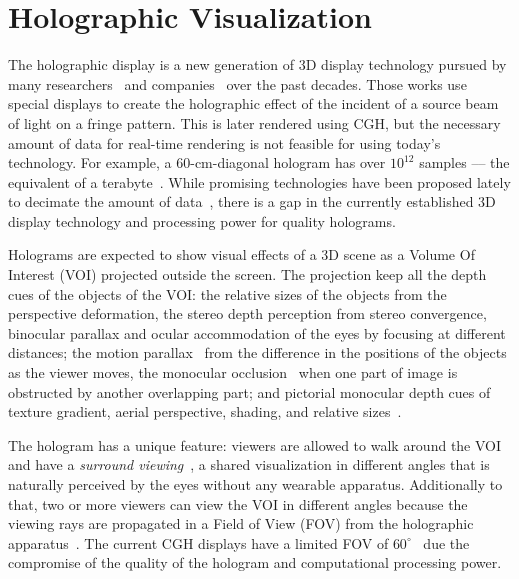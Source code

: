 \section{Holographic Visualization}
\label{sec.holographic_visualization}

The holographic display is a new generation of 3D display technology pursued by many researchers~\cite{Lucente1992, Watlington1995, Lucente2012} and companies~\cite{schwerdtner2013} over the past decades. Those works use special displays to create the holographic effect of the incident of a source beam of light on a fringe pattern. This is later rendered using CGH, but the necessary amount of data for real-time rendering is not feasible for using today's technology. For example, a 60-cm-diagonal hologram has over $10^{12}$ samples --– the equivalent of a terabyte~\cite{Lucente2012}. While promising technologies have been proposed lately to decimate the amount of data~\cite{Lucente1992, schwerdtner2013}, there is a gap in the currently established 3D display technology and processing power for quality holograms. 

Holograms are expected to show visual effects of a 3D scene as a Volume Of Interest (VOI) projected outside the screen. The projection keep all the depth cues of the objects of the VOI: the relative sizes of the objects from the perspective deformation, the stereo depth perception from stereo convergence, binocular parallax and ocular accommodation of the eyes by focusing at different distances; the motion parallax~\cite{li2012} from the difference in the positions of the objects as the viewer moves, the monocular occlusion~\cite{Lucente1995} when one part of image is obstructed by another overlapping part; and pictorial monocular depth cues of texture gradient, aerial perspective, shading, and relative sizes~\cite{Lucente1995}. 

The hologram has a unique feature: viewers are allowed to walk around the VOI and have a \emph{surround viewing}~\cite{debevec2006}, a shared visualization in different angles that is naturally perceived by the eyes without any wearable apparatus. Additionally to that, two or more viewers can view the VOI in different angles because the viewing rays are propagated in a Field of View (FOV) from the holographic apparatus~\cite{Lucente1992}. The current CGH displays have a limited FOV of $60^{\circ}$~\cite{Slinger2005, Lucente1995} due the compromise of the quality of the hologram and computational processing power.

